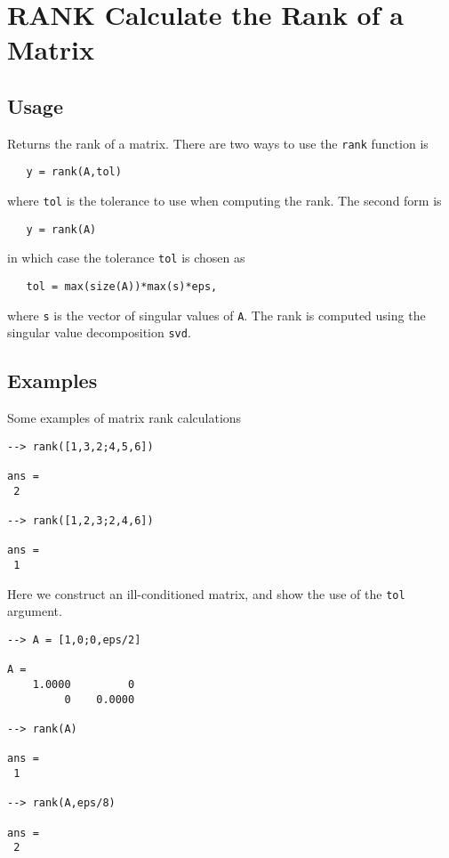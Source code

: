 \section{RANK Calculate the Rank of a Matrix}

\subsection{Usage}

Returns the rank of a matrix.  There are two ways to use
the \verb|rank| function is
\begin{verbatim}
   y = rank(A,tol)
\end{verbatim}
where \verb|tol| is the tolerance to use when computing the
rank.  The second form is
\begin{verbatim}
   y = rank(A)
\end{verbatim}
in which case the tolerance \verb|tol| is chosen as
\begin{verbatim}
   tol = max(size(A))*max(s)*eps,
\end{verbatim}
where \verb|s| is the vector of singular values of \verb|A|.  The
rank is computed using the singular value decomposition \verb|svd|.
\subsection{Examples}

Some examples of matrix rank calculations
\begin{verbatim}
--> rank([1,3,2;4,5,6])

ans = 
 2 

--> rank([1,2,3;2,4,6])

ans = 
 1 
\end{verbatim}
Here we construct an ill-conditioned matrix, and show the use 
of the \verb|tol| argument.
\begin{verbatim}
--> A = [1,0;0,eps/2]

A = 
    1.0000         0 
         0    0.0000 

--> rank(A)

ans = 
 1 

--> rank(A,eps/8)

ans = 
 2 
\end{verbatim}
